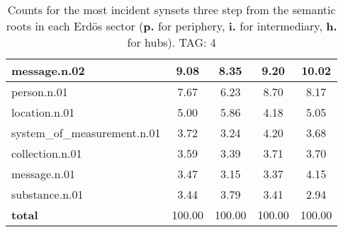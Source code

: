 \begin{table}[h!]
\begin{center}
\begin{tabular}{| l || c | c | c | c |}
message.n.02 & 9.08  & 8.35  & 9.20  & 10.02 \\\hline
person.n.01 & 7.67  & 6.23  & 8.70  & 8.17 \\\hline
location.n.01 & 5.00  & 5.86  & 4.18  & 5.05 \\\hline
system\_of\_measurement.n.01 & 3.72  & 3.24  & 4.20  & 3.68 \\\hline
collection.n.01 & 3.59  & 3.39  & 3.71  & 3.70 \\\hline
message.n.01 & 3.47  & 3.15  & 3.37  & 4.15 \\\hline
substance.n.01 & 3.44  & 3.79  & 3.41  & 2.94 \\\hline\hline
{{\bf total}} & 100.00  & 100.00  & 100.00  & 100.00 \\\hline
\end{tabular}
\caption{Counts for the most incident synsets three step from the semantic roots in each Erd\"os sector ({\bf p.} for periphery, {\bf i.} for intermediary, {\bf h.} for hubs). TAG: 4}
\end{center}
\end{table}